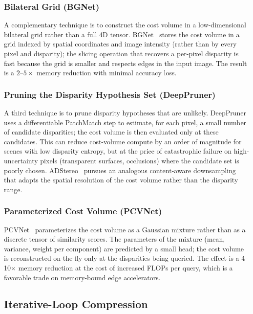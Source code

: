 \subsubsection{Bilateral Grid (BGNet)}

A complementary technique is to construct the cost volume in a low-dimensional bilateral grid rather than a full 4D tensor. BGNet~\cite{xu2021bgnet} stores the cost volume in a grid indexed by spatial coordinates and image intensity (rather than by every pixel and disparity); the slicing operation that recovers a per-pixel disparity is fast because the grid is smaller and respects edges in the input image. The result is a $2$--$5\times$ memory reduction with minimal accuracy loss.

\subsubsection{Pruning the Disparity Hypothesis Set (DeepPruner)}

A third technique is to prune disparity hypotheses that are unlikely. DeepPruner~\cite{duggal2019deeppruner} uses a differentiable PatchMatch step to estimate, for each pixel, a small number of candidate disparities; the cost volume is then evaluated only at these candidates. This can reduce cost-volume compute by an order of magnitude for scenes with low disparity entropy, but at the price of catastrophic failure on high-uncertainty pixels (transparent surfaces, occlusions) where the candidate set is poorly chosen. ADStereo~\cite{wang2023adstereo} pursues an analogous content-aware downsampling that adapts the spatial resolution of the cost volume rather than the disparity range.

\subsubsection{Parameterized Cost Volume (PCVNet)}

PCVNet~\cite{zeng2023pcvnet} parameterizes the cost volume as a Gaussian mixture rather than as a discrete tensor of similarity scores. The parameters of the mixture (mean, variance, weight per component) are predicted by a small head; the cost volume is reconstructed on-the-fly only at the disparities being queried. The effect is a 4--10$\times$ memory reduction at the cost of increased FLOPs per query, which is a favorable trade on memory-bound edge accelerators.

\subsection{Iterative-Loop Compression}
\label{ssec:iterloop}

